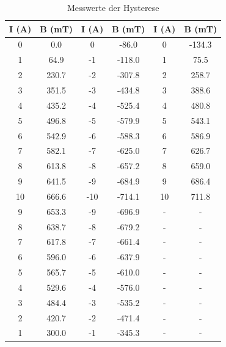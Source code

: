\begin{table}
\centering
\caption{Messwerte der Hysterese}
\begin{tabular}{c c c c c c}
  \toprule
   I (A) &  B (mT) &  I (A) &  B (mT) &  I (A) &  B (mT)\\
  \midrule
     0 &        0.0 &         0 &      -86.0 &   0 &     -134.3 \\
     1 &       64.9 &        -1 &     -118.0 &   1 &       75.5 \\
     2 &      230.7 &        -2 &     -307.8 &   2 &      258.7 \\
     3 &      351.5 &        -3 &     -434.8 &   3 &      388.6 \\
     4 &      435.2 &        -4 &     -525.4 &   4 &      480.8 \\
     5 &      496.8 &        -5 &     -579.9 &   5 &      543.1 \\
     6 &      542.9 &        -6 &     -588.3 &   6 &      586.9 \\
     7 &      582.1 &        -7 &     -625.0 &   7 &      626.7 \\
     8 &      613.8 &        -8 &     -657.2 &   8 &      659.0 \\
     9 &      641.5 &        -9 &     -684.9 &   9 &      686.4 \\
    10 &      666.6 &       -10 &     -714.1 &  10 &      711.8 \\
     9 &      653.3 &        -9 &     -696.9 &  -  &        -     \\
     8 &      638.7 &        -8 &     -679.2 &  -  &        -     \\
     7 &      617.8 &        -7 &     -661.4 &  -  &        -     \\
     6 &      596.0 &        -6 &     -637.9 &  -  &        -     \\
     5 &      565.7 &        -5 &     -610.0 &  -  &        -     \\
     4 &      529.6 &        -4 &     -576.0 &  -  &        -     \\
     3 &      484.4 &        -3 &     -535.2 &  -  &        -     \\
     2 &      420.7 &        -2 &     -471.4 &  -  &        -     \\
     1 &      300.0 &        -1 &     -345.3 &  -  &        -     \\
  \bottomrule
  \end{tabular}
\end{table}


